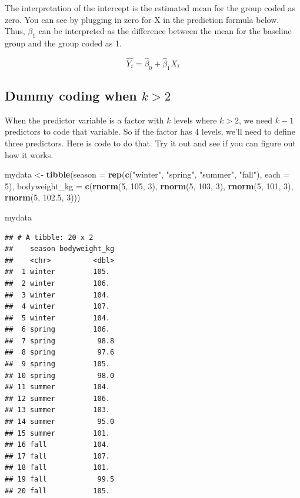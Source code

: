 \documentclass[]{book}
\newenvironment{Shaded}{\begin{snugshade}}{\end{snugshade}}
\newcommand{\DataTypeTok}[1]{\textcolor[rgb]{0.13,0.29,0.53}{#1}}
\newcommand{\DecValTok}[1]{\textcolor[rgb]{0.00,0.00,0.81}{#1}}
\newcommand{\FloatTok}[1]{\textcolor[rgb]{0.00,0.00,0.81}{#1}}
\newcommand{\KeywordTok}[1]{\textcolor[rgb]{0.13,0.29,0.53}{\textbf{#1}}}
\newcommand{\NormalTok}[1]{#1}
\newcommand{\StringTok}[1]{\textcolor[rgb]{0.31,0.60,0.02}{#1}}
\begin{document}
The interpretation of the intercept is the estimated mean for the group coded as zero. You can see by plugging in zero for X in the prediction formula below. Thus, \(\beta_1\) can be interpreted as the difference between the mean for the baseline group and the group coded as 1.

\[\hat{Y_i} = \hat{\beta}_0 + \hat{\beta}_1 X_i \]

\hypertarget{dummy-coding-when-k-2}{%
\subsection{\texorpdfstring{Dummy coding when \(k > 2\)}{Dummy coding when k \textgreater{} 2}}\label{dummy-coding-when-k-2}}

When the predictor variable is a factor with \(k\) levels where \(k>2\), we need \(k-1\) predictors to code that variable. So if the factor has 4 levels, we'll need to define three predictors. Here is code to do that. Try it out and see if you can figure out how it works.

\begin{Shaded}
\begin{Highlighting}[]
\NormalTok{mydata <-}\StringTok{ }\KeywordTok{tibble}\NormalTok{(}\DataTypeTok{season =} \KeywordTok{rep}\NormalTok{(}\KeywordTok{c}\NormalTok{(}\StringTok{"winter"}\NormalTok{, }\StringTok{"spring"}\NormalTok{, }\StringTok{"summer"}\NormalTok{, }\StringTok{"fall"}\NormalTok{), }\DataTypeTok{each =} \DecValTok{5}\NormalTok{),}
                 \DataTypeTok{bodyweight_kg =} \KeywordTok{c}\NormalTok{(}\KeywordTok{rnorm}\NormalTok{(}\DecValTok{5}\NormalTok{, }\DecValTok{105}\NormalTok{, }\DecValTok{3}\NormalTok{),}
                                   \KeywordTok{rnorm}\NormalTok{(}\DecValTok{5}\NormalTok{, }\DecValTok{103}\NormalTok{, }\DecValTok{3}\NormalTok{),}
                                   \KeywordTok{rnorm}\NormalTok{(}\DecValTok{5}\NormalTok{, }\DecValTok{101}\NormalTok{, }\DecValTok{3}\NormalTok{),}
                                   \KeywordTok{rnorm}\NormalTok{(}\DecValTok{5}\NormalTok{, }\FloatTok{102.5}\NormalTok{, }\DecValTok{3}\NormalTok{)))}

\NormalTok{mydata}
\end{Highlighting}
\end{Shaded}

\begin{verbatim}
## # A tibble: 20 x 2
##    season bodyweight_kg
##    <chr>          <dbl>
##  1 winter         105. 
##  2 winter         106. 
##  3 winter         104. 
##  4 winter         107. 
##  5 winter         104. 
##  6 spring         106. 
##  7 spring          98.8
##  8 spring          97.6
##  9 spring         105. 
## 10 spring          98.0
## 11 summer         104. 
## 12 summer         106. 
## 13 summer         103. 
## 14 summer          95.0
## 15 summer         101. 
## 16 fall           104. 
## 17 fall           107. 
## 18 fall           101. 
## 19 fall            99.5
## 20 fall           105.
\end{verbatim}
\end{document}
